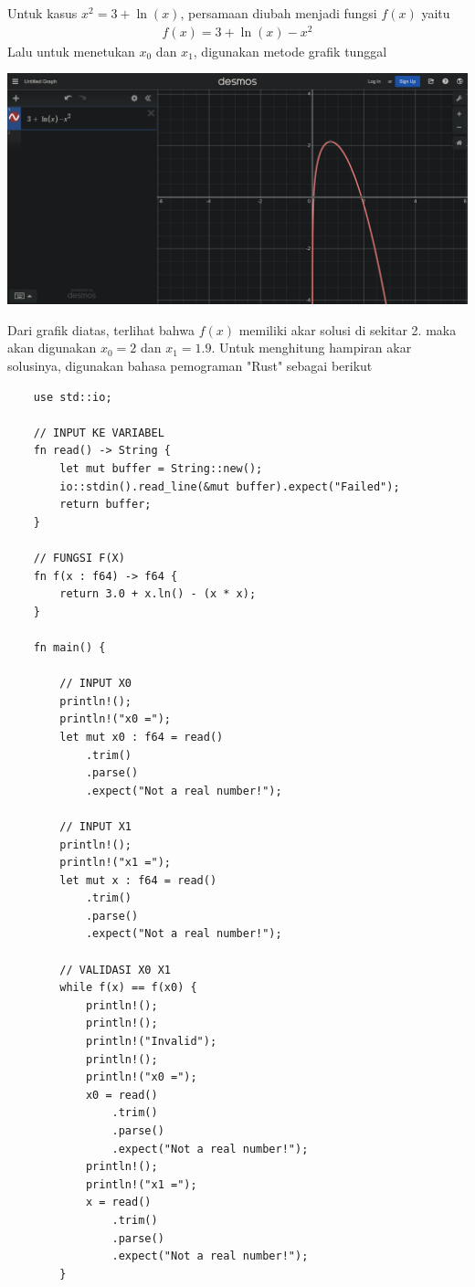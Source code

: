 \documentclass[12pt]{article}
\begin{document}
\begin{enumerate}
{        Untuk kasus $ x^2 = 3 + \ln(x) $, persamaan diubah menjadi fungsi $ f(x) $ yaitu
        \begin{align*}
            f(x) = 3 + \ln(x) - x^2
        \end{align*}
        Lalu untuk menetukan $ x_0 $ dan $ x_1 $, digunakan metode grafik tunggal
        \begin{center}
        \includegraphics[scale = 0.2]{Screenshot 2023-09-13 at 23-13-48 Desmos Graphing Calculator.png}
        \end{center}
        Dari grafik diatas, terlihat bahwa $ f(x) $ memiliki akar solusi di sekitar 2. maka akan digunakan $ x_0 = 2 $ dan $ x_1 = 1.9 $. Untuk menghitung hampiran akar solusinya, digunakan bahasa pemograman "Rust" sebagai berikut
        \begin{lstlisting}
    use std::io;

    // INPUT KE VARIABEL
    fn read() -> String {
        let mut buffer = String::new();
        io::stdin().read_line(&mut buffer).expect("Failed");
        return buffer;
    }
    
    // FUNGSI F(X)
    fn f(x : f64) -> f64 {
        return 3.0 + x.ln() - (x * x);
    }
    
    fn main() {
    
        // INPUT X0
        println!();
        println!("x0 =");
        let mut x0 : f64 = read()
            .trim()
            .parse()
            .expect("Not a real number!");
    
        // INPUT X1
        println!();
        println!("x1 =");
        let mut x : f64 = read()
            .trim()
            .parse()
            .expect("Not a real number!");
    
        // VALIDASI X0 X1
        while f(x) == f(x0) {
            println!();
            println!();
            println!("Invalid");
            println!();
            println!("x0 =");
            x0 = read()
                .trim()
                .parse()
                .expect("Not a real number!");
            println!();
            println!("x1 =");
            x = read()
                .trim()
                .parse()
                .expect("Not a real number!");
        }
    

\end{lstlisting}}
\end{enumerate}
\end{document}
